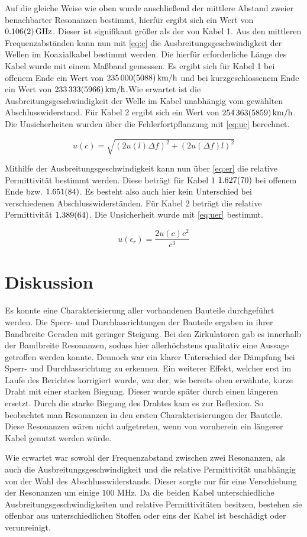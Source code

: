 Auf die gleiche Weise wie oben wurde anschließend der mittlere Abstand zweier benachbarter Resonanzen bestimmt, hierfür ergibt sich ein Wert von $\SI{0,106\pm0,002}{GHz}$. Dieser ist signifikant größer als der von Kabel 1. Aus den mittleren Frequenzabständen kann nun mit \cref{eq:c} die Ausbreitungsgeschwindigkeit der Wellen im Koaxialkabel bestimmt werden. Die hierfür erforderliche Länge des Kabel wurde mit einem Maßband gemessen. Es ergibt sich für Kabel 1 bei offenem Ende ein Wert von $\SI{235000\pm5088}{km/h}$ und bei kurzgeschlossenem Ende ein Wert von $\SI{233333\pm5966}{km/h}$.Wie erwartet ist die Ausbreitungsgeschwindigkeit der Welle im Kabel unabhängig vom gewählten Abschlusswiderstand. Für Kabel 2 ergibt sich ein Wert von $\SI{254363\pm5859}{km/h}$. Die Unsicherheiten wurden über die Fehlerfortpflanzung mit \cref{eq:uc} berechnet.

\begin{equation}
	u(c) = \sqrt{\left( 2u(l)\Delta f\right) ^2 +\left( 2u(\Delta f)l\right) ^2}
	\label{eq:uc}
\end{equation}

Mithilfe der Ausbreitungsgeschwindigkeit kann nun über \cref{eq:er} die relative Permittivität bestimmt werden. Diese beträgt für Kabel 1 $\SI{1,627\pm0,070}{}$ bei offenem Ende bzw. $\SI{1,651\pm0,084}{}$. Es besteht also auch hier kein Unterschied bei verschiedenen Abschlusswiderständen. Für Kabel 2 beträgt die relative Permittivität $\SI{1,389\pm0,064}{}$. Die Unsicherheit wurde mit \cref{eq:uer} bestimmt.

\begin{equation}
	u(\epsilon_r) = \frac{2u(c)c^2}{c^3}
	\label{eq:uer}
\end{equation}

\section{Diskussion}
Es konnte eine Charakterisierung aller vorhandenen Bauteile durchgeführt werden. Die Sperr- und Durchlassrichtungen der Bauteile ergaben in ihrer Bandbreite Geraden mit geringer Steigung. Bei den Zirkulatoren gab es innerhalb der Bandbreite Resonanzen, sodass hier allerhöchstens qualitativ eine Aussage getroffen werden konnte. Dennoch war ein klarer Unterschied der Dämpfung bei Sperr- und Durchlassrichtung zu erkennen. Ein weiterer Effekt, welcher erst im Laufe des Berichtes korrigiert wurde, war der, wie bereits oben erwähnte, kurze Draht mit einer starken Biegung. Dieser wurde später durch einen längeren ersetzt. Durch die starke Biegung des Drahtes kam es zur Reflexion. So beobachtet man Resonanzen in den ersten Charakterisierungen der Bauteile. Diese Resonanzen wären nicht aufgetreten, wenn von vornherein ein längerer Kabel genutzt werden würde. 

Wie erwartet war sowohl der Frequenzabstand zwischen zwei Resonanzen, als auch die Ausbreitungsgeschwindigkeit und die relative Permittivität unabhängig von der Wahl des Abschlusswiderstands. Dieser sorgte nur für eine Verschiebung der Resonanzen um einige $100$ MHz. Da die beiden Kabel unterschiedliche Ausbreitungsgeschwindigkeiten und relative Permittivitäten besitzen, bestehen sie offenbar aus unterschiedlichen Stoffen oder eins der Kabel ist beschädigt oder verunreinigt. 